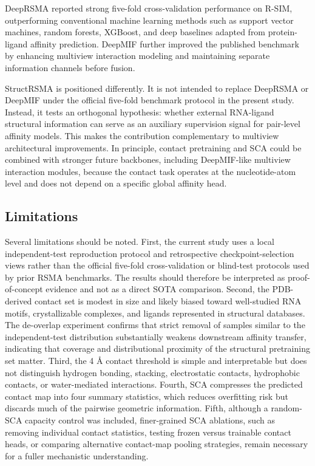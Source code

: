 ﻿\documentclass[journal=jcisd8,manuscript=article]{achemso}
\begin{document}
DeepRSMA reported strong five-fold cross-validation performance on R-SIM, outperforming conventional machine learning methods such as support vector machines, random forests, XGBoost, and deep baselines adapted from protein-ligand affinity prediction.\cite{Hearst1998SVM,Breiman2001RandomForests,Chen2016XGBoost,Abbasi2020DeepCDA,Wang2021DeepDTAF,Nguyen2021GraphDTA,Huang2024DeepRSMA} DeepMIF further improved the published benchmark by enhancing multiview interaction modeling and maintaining separate information channels before fusion.\cite{Song2026DeepMIF}

StructRSMA is positioned differently. It is not intended to replace DeepRSMA or DeepMIF under the official five-fold benchmark protocol in the present study. Instead, it tests an orthogonal hypothesis: whether external RNA-ligand structural information can serve as an auxiliary supervision signal for pair-level affinity models. This makes the contribution complementary to multiview architectural improvements. In principle, contact pretraining and SCA could be combined with stronger future backbones, including DeepMIF-like multiview interaction modules, because the contact task operates at the nucleotide-atom level and does not depend on a specific global affinity head.

\subsection{Limitations}

Several limitations should be noted. First, the current study uses a local independent-test reproduction protocol and retrospective checkpoint-selection views rather than the official five-fold cross-validation or blind-test protocols used by prior RSMA benchmarks. The results should therefore be interpreted as proof-of-concept evidence and not as a direct SOTA comparison. Second, the PDB-derived contact set is modest in size and likely biased toward well-studied RNA motifs, crystallizable complexes, and ligands represented in structural databases. The de-overlap experiment confirms that strict removal of samples similar to the independent-test distribution substantially weakens downstream affinity transfer, indicating that coverage and distributional proximity of the structural pretraining set matter. Third, the 4 \AA{} contact threshold is simple and interpretable but does not distinguish hydrogen bonding, stacking, electrostatic contacts, hydrophobic contacts, or water-mediated interactions. Fourth, SCA compresses the predicted contact map into four summary statistics, which reduces overfitting risk but discards much of the pairwise geometric information. Fifth, although a random-SCA capacity control was included, finer-grained SCA ablations, such as removing individual contact statistics, testing frozen versus trainable contact heads, or comparing alternative contact-map pooling strategies, remain necessary for a fuller mechanistic understanding.
\end{document}
